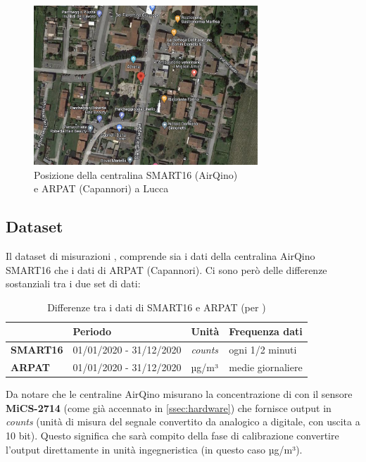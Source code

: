 \begin{figure}[H]
\centering
\captionsetup{justification=centering}
\includegraphics[width=0.75\textwidth,height=\textheight,keepaspectratio]{img/capannori_gps.png}
\caption{Posizione della centralina SMART16 (AirQino)\\e ARPAT (Capannori) a Lucca}
\label{fig:capannori-gps}
\end{figure}
\clearpage

\subsection{Dataset }\label{ssec:dataset-no2}
Il dataset di misurazioni , comprende sia i dati della centralina AirQino SMART16 che i dati di ARPAT (Capannori). Ci sono però delle differenze sostanziali tra i due set di dati:\\

\begin{table}[H]
\centering
\def\arraystretch{0.9}
\begin{tabular}{|l|l|l|l|}
\cline{2-4}
\multicolumn{1}{c|}{} & \textbf{Periodo} & \textbf{Unità} & \textbf{Frequenza dati} \\ \hline
\textbf{SMART16} & 01/01/2020 - 31/12/2020 & \textit{counts} & ogni 1/2 minuti \\ \hline
\textbf{ARPAT} & 01/01/2020 - 31/12/2020 & µg/m³ & medie giornaliere \\ \hline
\end{tabular}
\caption{Differenze tra i dati di SMART16 e ARPAT (per )}
\label{tab:dataset-no2-tabella}
\end{table}

Da notare che le centraline AirQino misurano la concentrazione di  con il sensore \textbf{MiCS-2714} (come già accennato in \ref{ssec:hardware}) che fornisce output in \textit{counts} (unità di misura del segnale convertito da analogico a digitale, con uscita a 10 bit). Questo significa che sarà compito della fase di calibrazione convertire l'output direttamente in unità ingegneristica (in questo caso µg/m³).\\

